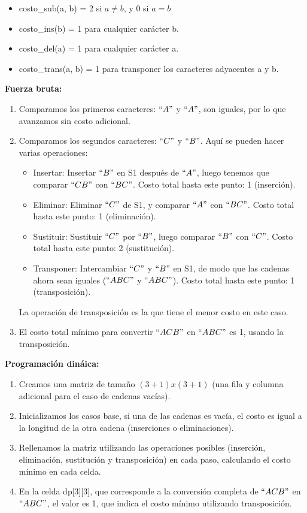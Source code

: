 \begin{itemize}
    \item costo\_sub(a, b) = 2 si $a \neq b$, y 0 si $a = b$
    \item costo\_ins(b) = 1 para cualquier carácter b.
    \item costo\_del(a) = 1 para cualquier carácter a.
    \item costo\_trans(a, b) = 1 para transponer los caracteres adyacentes a y b.
\end{itemize}

\textbf{Fuerza bruta:}
\begin{enumerate}
    \item Comparamos los primeros caracteres: $``A"$ y $``A"$, son iguales, por lo que avanzamos sin costo adicional.
    \item Comparamos los segundos caracteres: $``C"$ y $``B"$. Aquí se pueden hacer varias operaciones: 
    \begin{itemize}
        \item Insertar: Insertar $``B"$ en S1 después de $``A"$, luego tenemos que comparar $``CB"$ con $``BC"$. Costo total hasta este punto: 1 (inserción).
        \item Eliminar: Eliminar $``C"$ de S1, y comparar $``A"$ con $``BC"$. Costo total hasta este punto: 1 (eliminación).
        \item Sustituir: Sustituir $``C"$ por $``B"$, luego comparar $``B"$ con $``C"$. Costo total hasta este punto: 2 (sustitución).
        \item Transponer: Intercambiar $``C"$ y $``B"$ en S1, de modo que las cadenas ahora sean iguales ($``ABC"$ y $``ABC"$). Costo total hasta este punto: 1 (transposición).
    \end{itemize}

    La operación de transposición es la que tiene el menor costo en este caso.

    \item El costo total mínimo para convertir $``ACB"$ en $``ABC"$ es 1, usando la transposición.
\end{enumerate}

\textbf{Programación dináica:}
\begin{enumerate}
    \item Creamos una matriz de tamaño $(3+1)x(3+1)$ (una fila y columna adicional para el caso de cadenas vacías).
    \item Inicializamos los casos base, si una de las cadenas es vacía, el costo es igual a la longitud de la otra cadena (inserciones o eliminaciones).
    \item Rellenamos la matriz utilizando las operaciones posibles (inserción, eliminación, sustitución y transposición) en cada paso, calculando el costo mínimo en cada celda.
    \item En la celda dp[3][3], que corresponde a la conversión completa de $``ACB"$ en $``ABC"$, el valor es 1, que indica el costo mínimo utilizando transposición.
\end{enumerate}


